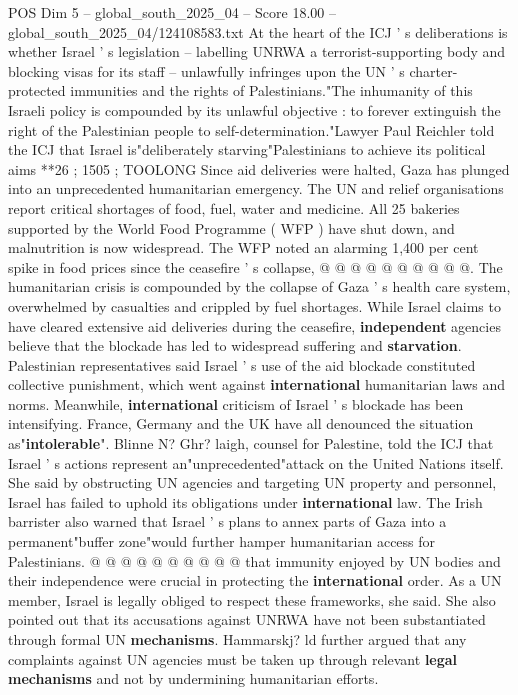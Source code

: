 \begin{textsample}{POS Dim 5 – global\_south\_2025\_04 – Score 18.00 – global\_south\_2025\_04/124108583.txt}
At the heart of the ICJ ' s deliberations is whether Israel ' s legislation -- labelling UNRWA a terrorist-supporting body and blocking visas for its staff -- unlawfully infringes upon the UN ' s charter-protected immunities and the rights of Palestinians."The inhumanity of this Israeli policy is compounded by its unlawful objective : to forever extinguish the right of the Palestinian people to self-determination."Lawyer Paul Reichler told the ICJ that Israel is"deliberately starving"Palestinians to achieve its political aims **26 ; 1505 ; TOOLONG Since aid deliveries were halted, Gaza has plunged into an unprecedented humanitarian emergency.
The UN and relief organisations report critical shortages of food, fuel, water and medicine.
All 25 bakeries supported by the World Food Programme ( WFP ) have shut down, and malnutrition is now widespread.
The WFP noted an alarming 1,400 per cent spike in food prices since the ceasefire ' s collapse, @ @ @ @ @ @ @ @ @ @.
The humanitarian crisis is compounded by the collapse of Gaza ' s health care system, overwhelmed by casualties and crippled by fuel shortages.
While Israel claims to have cleared extensive aid deliveries during the ceasefire, \textbf{independent} agencies believe that the blockade has led to widespread suffering and \textbf{starvation}.
Palestinian representatives said Israel ' s use of the aid blockade constituted collective punishment, which went against \textbf{international} humanitarian laws and norms.
Meanwhile, \textbf{international} criticism of Israel ' s blockade has been intensifying.
France, Germany and the UK have all denounced the situation as"\textbf{intolerable}".
Blinne N?
Ghr? laigh, counsel for Palestine, told the ICJ that Israel ' s actions represent an"unprecedented"attack on the United Nations itself.
She said by obstructing UN agencies and targeting UN property and personnel, Israel has failed to uphold its obligations under \textbf{international} law.
The Irish barrister also warned that Israel ' s plans to annex parts of Gaza into a permanent"buffer zone"would further hamper humanitarian access for Palestinians. @ @ @ @ @ @ @ @ @ @ that immunity enjoyed by UN bodies and their independence were crucial in protecting the \textbf{international} order.
As a UN member, Israel is legally obliged to respect these frameworks, she said.
She also pointed out that its accusations against UNRWA have not been substantiated through formal UN \textbf{mechanisms}.
Hammarskj? ld further argued that any complaints against UN agencies must be taken up through relevant \textbf{legal} \textbf{mechanisms} and not by undermining humanitarian efforts.

\end{textsample}
